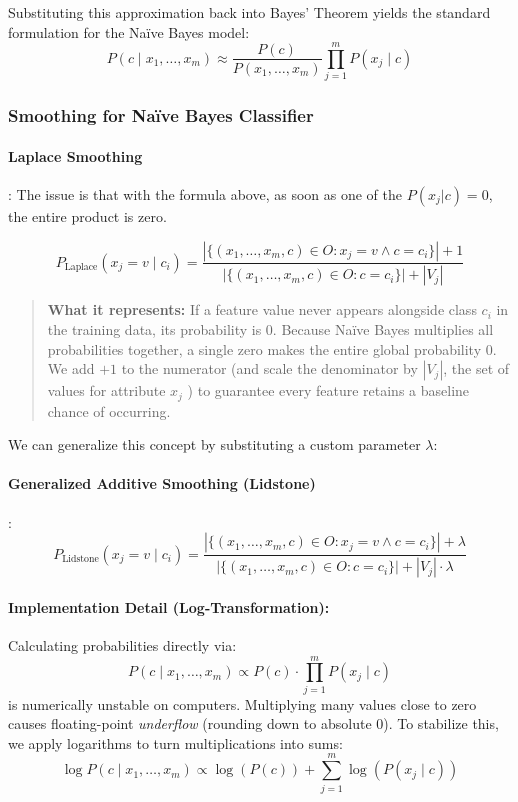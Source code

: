 \documentclass{article}
\begin{document}
Substituting this approximation back into Bayes' Theorem yields the standard formulation for the Naïve Bayes model:
\[ P(c \mid x_1, \dots, x_m) \approx \frac{P(c)}{P(x_1, \dots, x_m)} \prod_{j=1}^{m} P(x_j \mid c) \]

\subsubsection{Smoothing for Naïve Bayes Classifier}
\paragraph{Laplace Smoothing}: The issue is that with the formula above, as soon as one of the $P(x_j|c) = 0$, the entire product is zero.

\[ P_{\text{Laplace}}(x_j = v \mid c_i) = \frac{|\{(x_1,\dots,x_m,c) \in O : x_j = v \land c = c_i\}| + 1}{|\{(x_1,\dots,x_m,c) \in O : c = c_i\}| + |V_j|} \]
\begin{quote}
\textbf{What it represents:} If a feature value never appears alongside class $c_i$ in the training data, its probability is 0. Because Naïve Bayes multiplies all probabilities together, a single zero makes the entire global probability 0. We add $+1$ to the numerator (and scale the denominator by $|V_j|$, the set of values for attribute $x_j$ ) to guarantee every feature retains a baseline chance of occurring.
\end{quote}

We can generalize this concept by substituting a custom parameter $\lambda$:
\paragraph{Generalized Additive Smoothing (Lidstone)}: 
\[ P_{\text{Lidstone}}(x_j = v \mid c_i) = \frac{|\{(x_1,\dots,x_m,c) \in O : x_j = v \land c = c_i\}| + \lambda}{|\{(x_1,\dots,x_m,c) \in O : c = c_i\}| + |V_j| \cdot \lambda} \]

\paragraph{Implementation Detail (Log-Transformation):}
Calculating probabilities directly via:
\[ P(c \mid x_1,\dots,x_m) \propto P(c) \cdot \prod_{j=1}^m P(x_j \mid c) \]
is numerically unstable on computers. Multiplying many values close to zero causes floating-point \textit{underflow} (rounding down to absolute 0). To stabilize this, we apply logarithms to turn multiplications into sums:
\[ \log P(c \mid x_1,\dots,x_m) \propto \log(P(c)) + \sum_{j=1}^{m} \log(P(x_j \mid c)) \]
\end{document}
